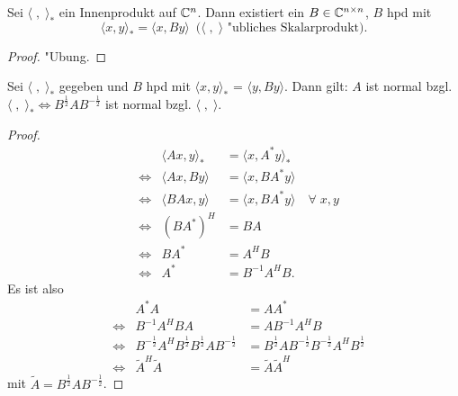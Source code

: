 %
\begin{lem}
 Sei $\langle \; , \; \rangle_*$ ein Innenprodukt auf  $\mathbb{C}^{n}$.
 Dann existiert ein $B \in \mathbb{C}^{n\times n}$, $B$ hpd mit
\[\langle x , y \rangle_* = \langle x,B y \rangle \enspace (\mbox{$\langle \; , \; \rangle$ "ubliches Skalarprodukt).} \]
\end{lem}
\begin{proof}
 "Ubung.
\end{proof}
%
\begin{sa}
 Sei $\langle \; , \; \rangle_*$ gegeben und $B$ hpd mit $\langle x, y \rangle_*$ = $\langle y, By\rangle$. Dann gilt:  $A$ ist normal bzgl.
$\langle \; , \; \rangle_* \Longleftrightarrow B^{\frac{1}{2}}AB^{-\frac{1}{2}} $ ist normal bzgl. $\langle \; , \; \rangle$.
\end{sa}
\begin{proof}
 \begin{align*}
  && \langle Ax, y\rangle_*  & = \langle x, A^*y\rangle_* \\
  & \Longleftrightarrow &  \langle Ax, By\rangle & =  \langle x, BA^*y\rangle \\
  & \Longleftrightarrow &  \langle BAx, y\rangle & =  \langle x, BA^*y\rangle \quad \forall \; x,y \\
  & \Longleftrightarrow  & (BA^*)^H   & =  BA   \\
  & \Longleftrightarrow  & BA^* & =  A^HB  \\
  & \Longleftrightarrow & A^* & = B^{-1}A^HB.
 \end{align*}
Es ist also
 \begin{align*}
  && A^*A & =AA^* \\
  & \Longleftrightarrow & B^{-1}A^HBA  & = AB^{-1} A^HB  \\
  & \Longleftrightarrow  & B^{-\frac{1}{2}}A^H B^{\frac{1}{2}}B^{\frac{1}{2}}AB^{-\frac{1}{2}}  & = B^{\frac{1}{2}}AB^{-\frac{1}{2}}B^{-\frac{1}{2}}A^HB^{\frac{1}{2}}   \\
  & \Longleftrightarrow  & \tilde{A}^H \tilde{A}  & = \tilde{A} \tilde{A}^H
 \end{align*}
mit $\tilde{A}=B^{\frac{1}{2}}AB^{-\frac{1}{2}}$.
\end{proof}
%

\medskip

